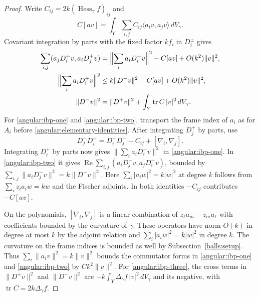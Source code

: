 \documentclass[11pt,a4paper]{article}
\theoremstyle{definition}
\theoremstyle{remark}
\DeclareMathOperator{\tr}{tr}
\numberwithin{equation}{section}
\begin{document}
\begin{proof}
Write $C_{ij}=2k(\operatorname{Hess}_\gamma f)_{ij}$ and
\[
 C[av]=\int_Y\sum_{i,j}C_{ij}\langle a_iv,a_jv\rangle\,dV_\gamma.
\]
Covariant integration by parts with the fixed factor $k f_i$ in
$D_i^\pm$ gives
\begin{align}
 \sum_{i,j}(a_jD_i^+v,a_iD_j^+v)
   &=\Bigl\|\sum_i a_iD_i^-v\Bigr\|^2-C[av]
                                    +O(k^2)\|v\|^2,\label{angular:ibp-one}\\
 \Bigl\|\sum_i a_iD_i^+v\Bigr\|^2
   &\le k\|D^-v\|^2-C[av]+O(k^2)\|v\|^2,\label{angular:ibp-two}\\
 \|D^-v\|^2
   &=\|D^+v\|^2+\int_Y\tr C\,|v|^2\,dV_\gamma.
                                                    \label{angular:ibp-three}
\end{align}
For \eqref{angular:ibp-one} and \eqref{angular:ibp-two}, transport
the frame index of $a_i$ as for $A_i$ before
\eqref{angular:elementary-identities}. After integrating $D_j^+$
by parts, use
\[
 D_j^-D_i^+=D_i^+D_j^--C_{ij}+[\nabla_i,\nabla_j].
\]
Integrating $D_i^+$ by parts now gives
$\|\sum_i a_iD_i^-v\|^2$ in \eqref{angular:ibp-one}. In
\eqref{angular:ibp-two} it gives
$\operatorname{Re}\sum_{i,j}(a_iD_j^-v,a_jD_i^-v)$, bounded by
$\sum_{i,j}\|a_iD_j^-v\|^2=k\|D^-v\|^2$. Here
$\sum_i|a_i w|^2=k|w|^2$ at degree $k$ follows from
$\sum_i z_i a_i w=kw$ and the Fischer adjoints.
In both identities $-C_{ij}$ contributes $-C[av]$.

On the polynomials, $[\nabla_i,\nabla_j]$ is a linear combination
of $z_\ell a_m-z_m a_\ell$ with coefficients bounded by the curvature
of $\gamma$. These operators have norm $O(k)$ in degree at most $k$
by the adjoint relation and $\sum_i|a_iw|^2=k|w|^2$ in degree $k$.
The curvature on the frame indices is bounded as well by
Subsection~\ref{balls:setup}. Thus $\sum_i\|a_iv\|^2=k\|v\|^2$
bounds the commutator forms in \eqref{angular:ibp-one} and
\eqref{angular:ibp-two} by $Ck^2\|v\|^2$. For
\eqref{angular:ibp-three}, the cross terms in $\|D^+v\|^2$ and
$\|D^-v\|^2$ are $-k\int_Y\Delta_\gamma f\,|v|^2\,dV_\gamma$
and its negative, with $\tr C=2k\Delta_\gamma f$.


\end{proof}
\end{document}
